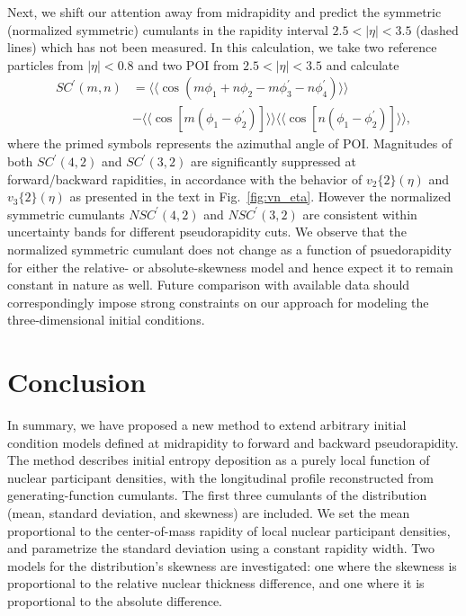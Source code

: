 Next, we shift our attention away from midrapidity and predict the symmetric (normalized symmetric) cumulants in the rapidity interval $2.5 < |\eta| < 3.5$ (dashed lines) which has not been measured.
In this calculation, we take two reference particles from $|\eta| < 0.8$ and two POI from $2.5 < |\eta| < 3.5$ and calculate
\begin{align}
SC^\prime(m, n) &= \langle\langle \cos(m\phi_1+n\phi_2-m\phi_3^\prime-n\phi_4^\prime)\rangle\rangle \\
\nonumber &- \langle\langle\cos[m(\phi_1-\phi_2^\prime)]\rangle\rangle\langle\langle\cos[n(\phi_1-\phi_2^\prime)]\rangle\rangle, \label{eq:scmn}
\end{align}
where the primed symbols represents the azimuthal angle of POI.
Magnitudes of both $SC^\prime(4, 2)$ and $SC^\prime(3, 2)$ are significantly suppressed at forward/backward rapidities, in accordance with the behavior of $v_2\{2\}(\eta)$ and $v_3\{2\}(\eta)$ as presented in the text in Fig.~\ref{fig:vn_eta}.
However the normalized symmetric cumulants $NSC^\prime(4,2)$ and $NSC^\prime(3,2)$ are consistent within uncertainty bands for different pseudorapidity cuts.
We observe that the normalized symmetric cumulant does not change as a function of psuedorapidity for either the relative- or absolute-skewness model and hence expect it to remain constant in nature as well.
Future comparison with available data should correspondingly impose strong constraints on our approach for modeling the three-dimensional initial conditions.


\section{Conclusion}

In summary, we have proposed a new method to extend arbitrary initial condition models defined at midrapidity to forward and backward pseudorapidity.
The method describes initial entropy deposition as a purely local function of nuclear participant densities, with the longitudinal profile reconstructed from generating-function cumulants.
The first three cumulants of the distribution (mean, standard deviation, and skewness) are included.
We set the mean proportional to the center-of-mass rapidity of local nuclear participant densities, and parametrize the standard deviation using a constant rapidity width.
Two models for the distribution's skewness are investigated: one where the skewness is proportional to the relative nuclear thickness difference, and one where it is proportional to the absolute difference.

